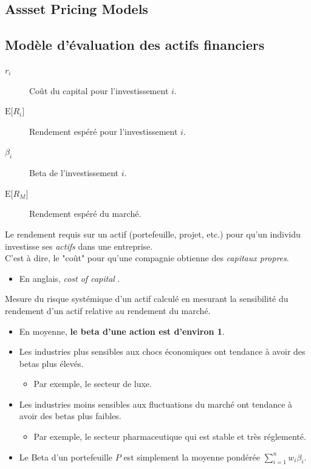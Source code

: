 \documentclass[10pt, french]{article}
\begin{document}
\begin{multicols*}{2}
\pagebreak
\section{Assset Pricing Models}
\subsection{Modèle d'évaluation des actifs financiers}
\begin{distributions}[Notation]
\begin{description}
	\item[$r_{i}$]	Coût du capital pour l'investissement $i$.
	\item[$\text{E}\lbrack R_{i} \rbrack$]	Rendement espéré pour l'investissement $i$.
	\item[$\beta_{i}$]	Beta de l'investissement $i$.
	\item[$\text{E}\lbrack R_{M} \rbrack$]	Rendement espéré du marché.
\end{description}
\end{distributions}

\begin{definitionNOHFILLsub}
Le rendement requis sur un actif (portefeuille, projet, etc.) pour qu'un individu investisse ses \textit{actifs} dans une entreprise.	\\
 C'est à dire, le "coût" pour qu'une compagnie obtienne des \textit{capitaux propres}.

\begin{itemize}
	\item	En anglais, \og \textit{cost of capital} \fg{}.
\end{itemize}

\end{definitionNOHFILLsub}

\begin{definitionNOHFILLsub}
Mesure du risque systémique d'un actif calculé en mesurant la sensibilité du rendement d'un actif relative au rendement du marché.
\begin{itemize}
	\item	En moyenne, \textbf{le beta d'une action est d'environ 1}.
	\item	Les industries plus sensibles aux chocs économiques ont tendance à avoir des betas plus élevés.
		\begin{itemize}
		\item	 Par exemple, le secteur de luxe.
		\end{itemize}
	\item	Les industries moins sensibles aux fluctuations du marché ont tendance à avoir des betas plus faibles.
		\begin{itemize}
		\item	Par exemple, le secteur pharmaceutique qui est stable et très réglementé.
		\end{itemize}
	\item	Le Beta d'un portefeuille $P$ est simplement la moyenne pondérée $\sum_{i = 1}^{n} w_{i} \beta_{i}$.
\end{itemize}


\end{definitionNOHFILLsub}
\end{multicols*}
\end{document}

